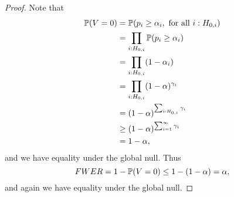 \begin{proof}
    Note that
    \begin{align*}
        {\mathbb{P}}(V=0) &={\mathbb{P}}(p_i \ge {\alpha}_i, \text{ for all }i:H_{0,i})\\
        &=\prod_{i:H_{0,i}}{\mathbb{P}}(p_i\ge {\alpha}_i)\\
        &= \prod_{i:H_{0,i}}(1-{\alpha}_i)\\
        &=\prod_{i:H_{0,i}}(1-{\alpha})^{\gamma_i}\\
        &=(1-{\alpha})^{\sum_{i:H_{0,i}}\gamma_i}\\
        &\ge (1-{\alpha})^{\sum_{i=1}^\infty \gamma_i}\\
        &=1-{\alpha},
    \end{align*}
    and we have equality under the global null. Thus 
    \[FWER =  1-{\mathbb{P}}(V=0) \le 1-(1-{\alpha})={\alpha},\]
    and again we have equality under the global null.
\end{proof}
